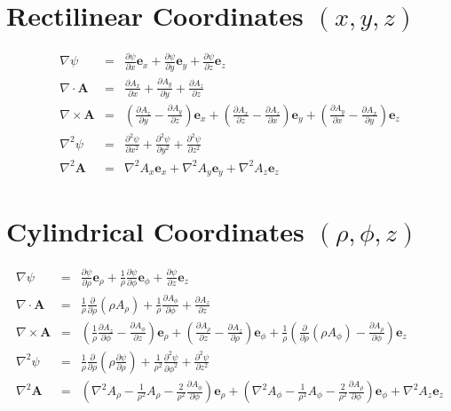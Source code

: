 \section{Rectilinear Coordinates \texorpdfstring{$(x, y, z)$}{(x, y, z)}}
\begin{eqnarray}
\nabla \psi & = & \frac{\partial \psi}{\partial x} \mathbf{e}_x + \frac{\partial \psi}{\partial y} \mathbf{e}_y + \frac{\partial \psi}{\partial z} \mathbf{e}_z \\
\nabla \cdot \mathbf{A} & = & \frac{\partial A_x}{\partial x} + \frac{\partial A_y}{\partial y} + \frac{\partial A_z}{\partial z} \\
\nabla \times \mathbf{A} & = & \left( \frac{\partial A_z}{\partial y} - \frac{\partial A_y}{\partial z} \right) \mathbf{e}_x + \left( \frac{\partial A_x}{\partial z} - \frac{\partial A_z}{\partial x} \right) \mathbf{e}_y + \left( \frac{\partial A_y}{\partial x} - \frac{\partial A_x}{\partial y} \right) \mathbf{e}_z \\
\nabla^2 \psi & = & \frac{\partial^2 \psi}{\partial x^2} + \frac{\partial^2 \psi}{\partial y^2} + \frac{\partial^2 \psi}{\partial z^2} \\
\nabla^2 \mathbf{A} & = & \nabla^2 A_x \mathbf{e}_x + \nabla^2 A_y \mathbf{e}_y + \nabla^2 A_z \mathbf{e}_z
\end{eqnarray}


\section{Cylindrical Coordinates \texorpdfstring{$(\rho, \phi, z)$}{(rho, phi, z)}}
\begin{eqnarray}
\nabla \psi & = & \frac{\partial \psi}{\partial \rho} \mathbf{e}_\rho + \frac{1}{\rho} \frac{\partial \psi}{\partial \phi} \mathbf{e}_\phi + \frac{\partial \psi}{\partial z} \mathbf{e}_z \\
\nabla \cdot \mathbf{A} & = & \frac{1}{\rho} \frac{\partial}{\partial \rho} \left( \rho A_\rho \right) + \frac{1}{\rho} \frac{\partial A_\phi}{\partial \phi} + \frac{\partial A_z}{\partial z} \\
\nabla \times \mathbf{A} & = & \left( \frac{1}{\rho} \frac{\partial A_z}{\partial \phi} - \frac{\partial A_\phi}{\partial z} \right) \mathbf{e}_\rho + \left( \frac{\partial A_\rho}{\partial z} - \frac{\partial A_z}{\partial \rho} \right) \mathbf{e}_\phi + \frac{1}{\rho} \left( \frac{\partial}{\partial \rho} \left( \rho A_\phi \right) - \frac{\partial A_\rho}{\partial \phi} \right) \mathbf{e}_z \\
\nabla^2 \psi & = & \frac{1}{\rho} \frac{\partial}{\partial \rho} \left( \rho \frac{\partial \psi}{\partial \rho} \right) + \frac{1}{\rho^2} \frac{\partial^2 \psi}{\partial \phi^2} + \frac{\partial^2 \psi}{\partial z^2} \\
\nabla^2 \mathbf{A} & = & \left( \nabla^2 A_\rho - \frac{1}{\rho^2} A_\rho - \frac{2}{\rho^2} \frac{\partial A_\phi}{\partial \phi} \right) \mathbf{e}_\rho + \left( \nabla^2 A_\phi - \frac{1}{\rho^2} A_\phi - \frac{2}{\rho^2} \frac{\partial A_\rho}{\partial \phi} \right) \mathbf{e}_\phi + \nabla^2 A_z \mathbf{e}_z
\end{eqnarray}


